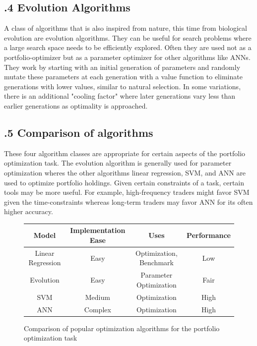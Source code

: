 \documentclass[12pt]{report}
\begin{document}
\newpage
\subsection*{.4 Evolution Algorithms}

A class of algorithms that is also inspired from nature, this time from biological evolution are evolution algorithms. They can be useful for search problems where a large search space needs to be efficiently explored. Often they are used not as a portfolio-optimizer but as a parameter optimizer for other algorithms like ANNs. They work by starting with an initial generation of parameters and randomly mutate these parameters at each generation with a value function to eliminate generations with lower values, similar to natural selection. In some variations, there is an additional "cooling factor" where later generations vary less than earlier generations as optimality is approached. 

\newpage
\subsection*{.5 Comparison of algorithms}

These four algorithm classes are appropriate for certain aspects of the portfolio optimization task. The evolution algorithm is generally used for parameter optimization wheres the other algorithms linear regression, SVM, and ANN are used to optimize portfolio holdings. Given certain constraints of a task, certain tools may be more useful. For example, high-frequency traders might favor SVM given the time-constraints whereas long-term traders may favor ANN for its often higher accuracy.\\

\begin{figure}[H]
   \centering %
   \begin{tabular}{ |c|c|c|c| }
 	\hline
 	\textbf{Model} & \textbf{Implementation Ease} & \textbf{Uses} & \textbf{Performance} \\ \hline
 	Linear Regression & Easy & Optimization, Benchmark & Low \\ 	\hline
 	Evolution & Easy & Parameter Optimization & Fair \\ \hline
 	SVM & Medium & Optimization & High \\ \hline
 	ANN & Complex & Optimization & High \\ \hline
	\end{tabular}
	\caption{Comparison of popular optimization algorithms for the portfolio optimization task}
\end{figure}
\end{document}
